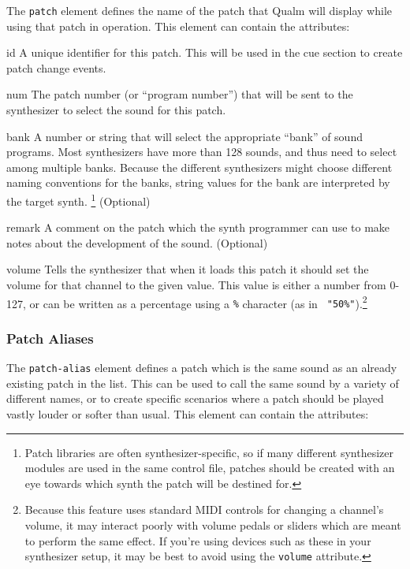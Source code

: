 \documentclass{article}
\newcommand{\q}{{\textsf{Qualm}}\xspace}
\newcommand{\attrlabel}[1]{\mbox{{\ttfamily\itshape #1}}~~--}
\newenvironment{attributes}
  {\list{}{\let\makelabel\attrlabel}}
  {\endlist}
\begin{document}
The {\tt patch} element defines the name of the patch that \q will
display while using that patch in operation.  This element can contain
the attributes:

\begin{attributes}
\item[id] A unique identifier for this patch.  This will be used in
  the cue section to create patch change events.
\item[num] The patch number (or ``program number'') that will be sent
  to the synthesizer to select the sound for this patch.
\item[bank] A number or string that will select the appropriate
  ``bank'' of sound programs.  Most synthesizers have more than 128
  sounds, and thus need to select among multiple banks.  Because the
  different synthesizers might choose different naming conventions for
  the banks, string values for the bank are interpreted by the target
  synth.  \footnote{Patch libraries are often synthesizer-specific,
    so if many different synthesizer modules are used in the same
    control file, patches should be created with an eye towards which
    synth the patch will be destined for.}  (Optional)
\item[remark] A comment on the patch which the synth programmer can
  use to make notes about the development of the sound. (Optional)
\item[volume] Tells the synthesizer that when it loads this patch it
  should set the volume for that channel to the given value.  This
  value is either a number from 0-127, or can be written as a
  percentage using a {\tt \%} character (as in {\tt
    "50\%"}).\footnote{Because this feature uses standard MIDI
    controls for changing a channel's volume, it may interact poorly
    with volume pedals or sliders which are meant to perform the same
    effect.  If you're using devices such as these in your synthesizer
    setup, it may be best to avoid using the {\tt volume} attribute.}
\end{attributes}

\subsubsection{Patch Aliases}

The {\tt patch-alias} element defines a patch which is the same sound
as an already existing patch in the list.  This can be used to call
the same sound by a variety of different names, or to create specific
scenarios where a patch should be played vastly louder or softer than
usual.  This element can contain the attributes:
\end{document}
